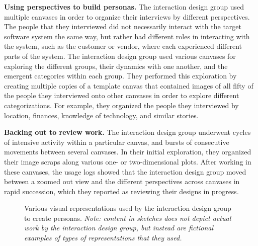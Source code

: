 \documentclass[12pt,fleqn]{ucithesis}
\begin{document}
\textbf{Using perspectives to build personas.} The interaction design group used multiple canvases in order to organize their interviews by different perspectives. The people that they interviewed did not necessarily interact with the target software system the same way, but rather had different roles in interacting with the system, such as the customer or vendor, where each experienced different parts of the system. The interaction design group used various canvases for exploring the different groups, their dynamics with one another, and the emergent categories within each group. They performed this exploration by creating multiple copies of a template canvas that contained images of all fifty of the people they interviewed onto other canvases in order to explore different categorizations. For example, they organized the people they interviewed by location, finances, knowledge of technology, and similar stories. 

\textbf{Backing out to review work.} The interaction design group underwent cycles of intensive activity within a particular canvas, and bursts of consecutive movements between several canvases. In their initial exploration, they organized their image scraps along various one- or two-dimensional plots. After working in these canvases, the usage logs showed that the interaction design group moved between a zoomed out view and the different perspectives across canvases in rapid succession, which they reported as reviewing their designs in progress.

\begin{figure}%
  \centering
   \caption {Various visual representations used by the interaction design group to create personas. \textit{Note: content in sketches does not depict actual work by the interaction design group, but instead are fictional examples of types of representations that they used.}}
   \label{fig:ixdgroup:session1}
\end{figure}%
\end{document}
